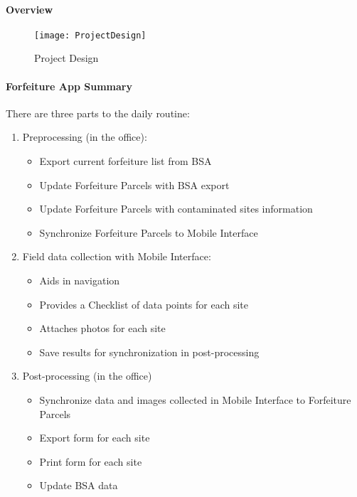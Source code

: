 \documentclass[class=book , crop=false, titlepage, twoside, multi={itemize, figure, verbatim}, float=false]{standalone}
\begin{document}
\paragraph[Overview]{Overview}

%
%
\vspace{-.2in}

\begin{figure}[h!]
\centering
    \texttt{[image: ProjectDesign]}
\vspace{-.2in}

\caption{Project Design}
\end{figure}
\clearpage
%
%
%
\paragraph{Forfeiture App Summary}
\vspace{.25in}

There are three parts to the daily routine:
\begin{enumerate}
\item \Large Preprocessing \normalsize(in the office):
%
\begin{itemize}
\item Export current forfeiture list from BSA
\item Update Forfeiture Parcels with BSA export
\item Update Forfeiture Parcels with contaminated sites information
\item Synchronize Forfeiture Parcels to Mobile Interface
\end{itemize}
%
\item \Large Field data collection \normalsize with Mobile Interface:
%
\begin{itemize}
\item Aids in navigation
\item Provides a Checklist of data points for each site
\item Attaches photos for each site
\item Save results for synchronization in post-processing
\end{itemize}
%
\item \Large Post-processing \normalsize (in the office)
%
\begin{itemize}
\item Synchronize data and images collected in Mobile Interface to Forfeiture Parcels
\item Export form for each site
\item Print form for each site
\item Update BSA data
%
\end{itemize}
%
\end{enumerate}
%
\clearpage
%
%
\end{document}

